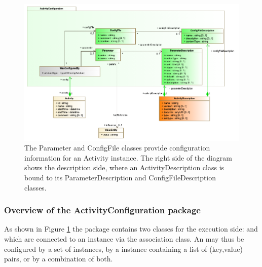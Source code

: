 \begin{figure}[hbt]
\centering
\includegraphics[width=1.0\textwidth]{figures/PR2-ActivityConfiguration_20190429.png}
\caption{The Parameter and ConfigFile classes provide configuration information for an Activity instance. The right side of the diagram shows the description side, where an ActivityDescription class is bound to its ParameterDescription and ConfigFileDescription classes.}
\label{fig:activityconfig}
\end{figure}

\subsubsection{Overview of the ActivityConfiguration package} \label{sec:configurationpackage}

As shown in Figure \ref{fig:activityconfig} the  package contains two classes for the execution side:  and  which are connected to an  instance via the  association class.
An  may thus be configured by a set of  instances, by a  instance containing a list of (key,value) pairs, or by a combination of both. 


